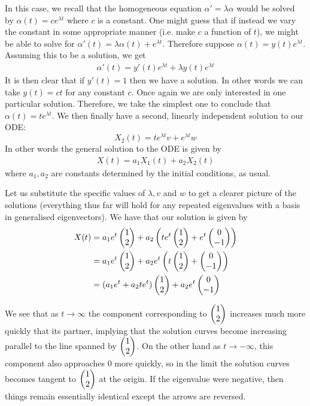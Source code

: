 In this case, we recall that the homogeneous equation $\alpha' = \lambda \alpha$ would be solved by $\alpha(t) = c e^{\lambda t}$ where $c$ is a constant. One might guess that if instead we vary the constant in some appropriate manner (i.e. make $c$ a function of $t$), we might be able to solve for $\alpha'(t) = \lambda \alpha(t) + e^{\lambda t}$. Therefore suppose $\alpha(t) = y(t) e^{\lambda t}$. Assuming this to be a solution, we get
\begin{align*}
    \alpha'(t) = y'(t) e^{\lambda t} + \lambda y(t) e^{\lambda t}
\end{align*}
It is then clear that if $y'(t) = 1$ then we have a solution. In other words we can take $y(t) = ct$ for any constant $c$. Once again we are only interested in one particular solution. Therefore, we take the simplest one to conclude that $\alpha(t) = te^{\lambda t}$. We then finally have a second, linearly independent solution to our ODE:
$$ X_2(t) = te^{\lambda t} v + e^{\lambda t}w $$
In other words the general solution to the ODE is given by
\begin{align*}
    X(t) = a_1 X_1(t) + a_2 X_2(t)
\end{align*}
where $a_1, a_2$ are constants determined by the initial conditions, as usual.

Let us substitute the specific values of $\lambda, v$ and $w$ to get a clearer picture of the solutions (everything thus far will hold for any repeated eigenvalues with a basis in generalised eigenvectors). We have that our solution is given by
\begin{align*}
    X(t) &= a_1 e^{t} \begin{pmatrix} 1\\2 \end{pmatrix} + a_2 \left( t e^{t} \begin{pmatrix} 1\\2 \end{pmatrix} + e^{t} \begin{pmatrix} 0\\-1 \end{pmatrix} \right)\\
    &= a_1 e^{t} \begin{pmatrix} 1\\2 \end{pmatrix} + a_2 e^{t} \left( t \begin{pmatrix} 1\\2 \end{pmatrix} + \begin{pmatrix} 0\\-1 \end{pmatrix}  \right)\\
    &= (a_1 e^{t} + a_2 t e^{t}) \begin{pmatrix} 1\\2 \end{pmatrix} + a_2 e^{t} \begin{pmatrix} 0\\-1 \end{pmatrix}
\end{align*}

We see that as $t \to \infty$ the component corresponding to $\begin{pmatrix} 1\\2 \end{pmatrix}$ increases much more quickly that its partner, implying that the solution curves become increasing parallel to the line spanned by $\begin{pmatrix} 1\\2 \end{pmatrix}$. On the other hand as $t \to -\infty$, this component also approaches 0 more quickly, so in the limit the solution curves becomes tangent to $\begin{pmatrix} 1\\2 \end{pmatrix}$ at the origin. If the eigenvalue were negative, then things remain essentially identical except the arrows are reversed.

